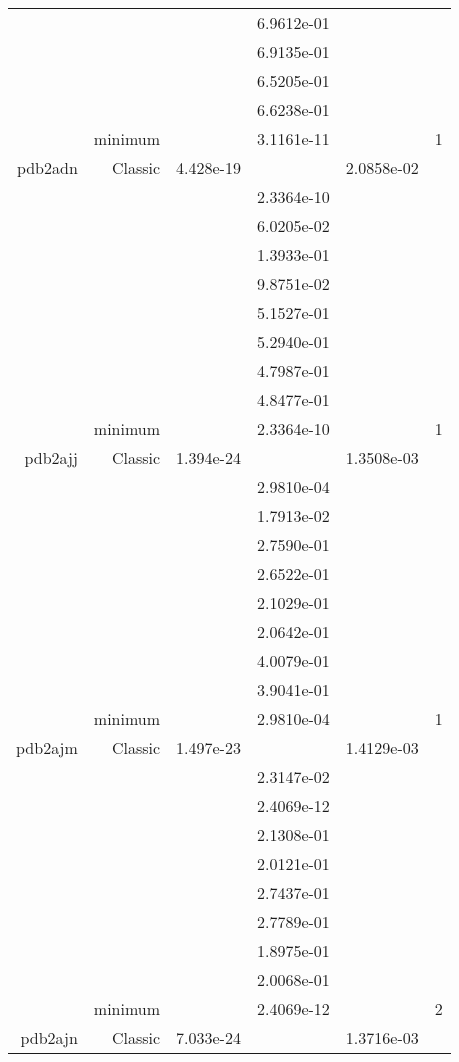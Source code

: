 \begin{xltabular}{\textwidth}{r|rS[table-format=1.3e+2]S[table-format=1.4e+2]S[table-format=1.4e+2]S[table-format=-1.5]}
&  &  & 6.9612e-01 & & \\
&  &  & 6.9135e-01 & & \\
&  &  & 6.5205e-01 & & \\
&  &  & 6.6238e-01 & & \\
& minimum &  & 3.1161e-11 & & 1 \\  \addlinespace
pdb2adn & Classic & 4.428e-19 &  & 2.0858e-02 & \\
&  &  & 2.3364e-10 & & \\
&  &  & 6.0205e-02 & & \\
&  &  & 1.3933e-01 & & \\
&  &  & 9.8751e-02 & & \\
&  &  & 5.1527e-01 & & \\
&  &  & 5.2940e-01 & & \\
&  &  & 4.7987e-01 & & \\
&  &  & 4.8477e-01 & & \\
& minimum &  & 2.3364e-10 & & 1 \\  \addlinespace
pdb2ajj & Classic & 1.394e-24 &  & 1.3508e-03 & \\
&  &  & 2.9810e-04 & & \\
&  &  & 1.7913e-02 & & \\
&  &  & 2.7590e-01 & & \\
&  &  & 2.6522e-01 & & \\
&  &  & 2.1029e-01 & & \\
&  &  & 2.0642e-01 & & \\
&  &  & 4.0079e-01 & & \\
&  &  & 3.9041e-01 & & \\
& minimum &  & 2.9810e-04 & & 1 \\  \addlinespace
pdb2ajm & Classic & 1.497e-23 &  & 1.4129e-03 & \\
&  &  & 2.3147e-02 & & \\
&  &  & 2.4069e-12 & & \\
&  &  & 2.1308e-01 & & \\
&  &  & 2.0121e-01 & & \\
&  &  & 2.7437e-01 & & \\
&  &  & 2.7789e-01 & & \\
&  &  & 1.8975e-01 & & \\
&  &  & 2.0068e-01 & & \\
& minimum &  & 2.4069e-12 & & 2 \\  \addlinespace
pdb2ajn & Classic & 7.033e-24 &  & 1.3716e-03 & \\

\end{xltabular}

